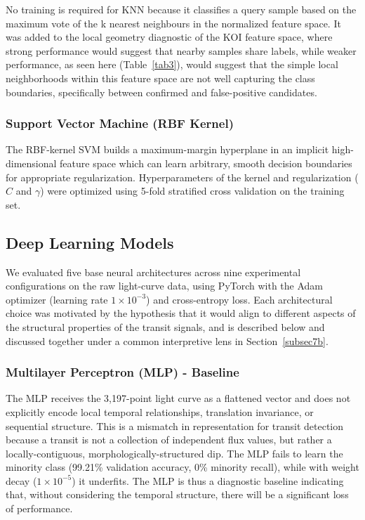 \documentclass[preprint,11pt,times]{elsarticle}
\begin{document}
No training is required for KNN because it classifies a query sample based on the maximum vote of the k nearest neighbours in the normalized feature space. It was added to the local geometry diagnostic of the KOI feature space, where strong performance would suggest that nearby samples share labels, while weaker performance, as seen here (Table~\ref{tab3}), would suggest that the simple local neighborhoods within this feature space are not well capturing the class boundaries, specifically between confirmed and false-positive candidates.

\subsubsection{Support Vector Machine (RBF Kernel)}\label{subsubsec4a5}

The RBF-kernel SVM builds a maximum-margin hyperplane in an implicit high-dimensional feature space which can learn arbitrary, smooth decision boundaries for appropriate regularization. Hyperparameters of the kernel and regularization ($C$ and $\gamma$) were optimized using 5-fold stratified cross validation on the training set.

\subsection{Deep Learning Models}\label{subsec4b}

We evaluated five base neural architectures across nine experimental configurations on the raw light-curve data, using PyTorch with the Adam optimizer (learning rate $1\times10^{-3}$) and cross-entropy loss. Each architectural choice was motivated by the hypothesis that it would align to different aspects of the structural properties of the transit signals, and is described below and discussed together under a common interpretive lens in Section~\ref{subsec7b}.

\subsubsection{Multilayer Perceptron (MLP) - Baseline}\label{subsubsec4b1}

The MLP receives the 3,197-point light curve as a flattened vector and does not explicitly encode local temporal relationships, translation invariance, or sequential structure. This is a mismatch in representation for transit detection because a transit is not a collection of independent flux values, but rather a locally-contiguous, morphologically-structured dip. The MLP fails to learn the minority class (99.21\% validation accuracy, 0\% minority recall), while with weight decay ($1\times10^{-5}$) it underfits. The MLP is thus a diagnostic baseline indicating that, without considering the temporal structure, there will be a significant loss of performance.
\end{document}
